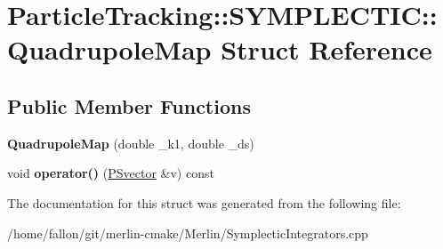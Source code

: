 \hypertarget{structParticleTracking_1_1SYMPLECTIC_1_1QuadrupoleMap}{}\section{Particle\+Tracking\+:\+:S\+Y\+M\+P\+L\+E\+C\+T\+IC\+:\+:Quadrupole\+Map Struct Reference}
\label{structParticleTracking_1_1SYMPLECTIC_1_1QuadrupoleMap}
\subsection*{Public Member Functions}
\begin{DoxyCompactItemize}
\item 
\mbox{\label{structParticleTracking_1_1SYMPLECTIC_1_1QuadrupoleMap_aab96a0acffbac0d7c37e4c33afa91c86}} 
{\bfseries Quadrupole\+Map} (double \+\_\+k1, double \+\_\+ds)
\item 
\mbox{\label{structParticleTracking_1_1SYMPLECTIC_1_1QuadrupoleMap_a0201ce5e1dc97381f9df58d3fe6eb502}} 
void {\bfseries operator()} (\hyperlink{classPSvector}{P\+Svector} \&v) const
\end{DoxyCompactItemize}


The documentation for this struct was generated from the following file\+:\begin{DoxyCompactItemize}
\item 
/home/fallon/git/merlin-\/cmake/\+Merlin/Symplectic\+Integrators.\+cpp\end{DoxyCompactItemize}
